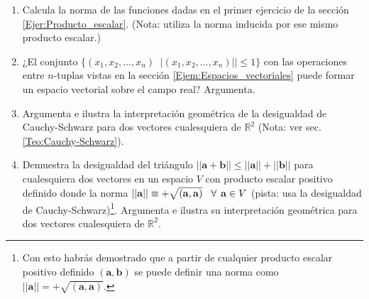 \begin{enumerate}
    \item Calcula la norma de las funciones dadas en el primer ejercicio de la sección \ref{Ejer:Producto_escalar}. (Nota: utiliza la norma inducida por ese mismo producto escalar.) 
    \item ¿El conjunto $\{(x_1,x_2,...,x_n)\mathop|\mathop x_i\in\mathbb{R} \land ||(x_1,x_2,...,x_n)||\leq1\}$ con las operaciones entre $n$-tuplas vistas en la sección \ref{Ejem:Espacios_vectoriales} puede formar un espacio vectorial sobre el campo real? Argumenta. 
    \item Argumenta e ilustra la interpretación geométrica de la desigualdad de Cauchy-Schwarz para dos vectores cualesquiera de $\mathbb{R}^2$ (Nota: ver sec. \ref{Teo:Cauchy-Schwarz}). 
    \item Demuestra la desigualdad del triángulo $||\mathbf{a}+\mathbf{b}|| \leq ||\mathbf{a}||+||\mathbf{b}||$ para cualesquiera dos vectores en un espacio $V$ con producto escalar positivo definido donde la norma $||\mathbf{a}||\equiv+\sqrt{(\mathbf{a},\mathbf{a})}\hspace{3mm}\forall\hspace{1.5mm} \mathbf{a}\in V$ (pista: usa la desigualdad de Cauchy-Schwarz)\footnote{Con esto habrás demostrado que a partir de cualquier producto escalar positivo definido $(\mathbf{a},\mathbf{b})$ se puede definir una norma como $||\mathbf{a}|| = +\sqrt{(\mathbf{a},\mathbf{a})}.$}. Argumenta e ilustra su interpretación geométrica para dos vectores cualesquiera de $\mathbb{R}^2$. 
\end{enumerate}

